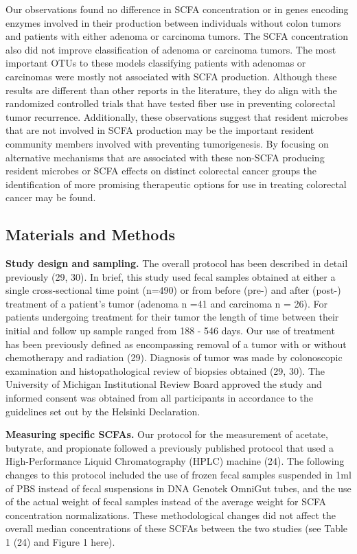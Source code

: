 \documentclass[11pt,]{article}
\begin{document}
Our observations found no difference in SCFA concentration or in genes
encoding enzymes involved in their production between individuals
without colon tumors and patients with either adenoma or carcinoma
tumors. The SCFA concentration also did not improve classification of
adenoma or carcinoma tumors. The most important OTUs to these models
classifying patients with adenomas or carcinomas were mostly not
associated with SCFA production. Although these results are different
than other reports in the literature, they do align with the randomized
controlled trials that have tested fiber use in preventing colorectal
tumor recurrence. Additionally, these observations suggest that resident
microbes that are not involved in SCFA production may be the important
resident community members involved with preventing tumorigenesis. By
focusing on alternative mechanisms that are associated with these
non-SCFA producing resident microbes or SCFA effects on distinct
colorectal cancer groups the identification of more promising
therapeutic options for use in treating colorectal cancer may be found.

\newpage

\subsection{Materials and Methods}\label{materials-and-methods}

\textbf{Study design and sampling.} The overall protocol has been
described in detail previously (29, 30). In brief, this study used fecal
samples obtained at either a single cross-sectional time point (n=490)
or from before (pre-) and after (post-) treatment of a patient's tumor
(adenoma n =41 and carcinoma n = 26). For patients undergoing treatment
for their tumor the length of time between their initial and follow up
sample ranged from 188 - 546 days. Our use of treatment has been
previously defined as encompassing removal of a tumor with or without
chemotherapy and radiation (29). Diagnosis of tumor was made by
colonoscopic examination and histopathological review of biopsies
obtained (29, 30). The University of Michigan Institutional Review Board
approved the study and informed consent was obtained from all
participants in accordance to the guidelines set out by the Helsinki
Declaration.

\textbf{Measuring specific SCFAs.} Our protocol for the measurement of
acetate, butyrate, and propionate followed a previously published
protocol that used a High-Performance Liquid Chromatography (HPLC)
machine (24). The following changes to this protocol included the use of
frozen fecal samples suspended in 1ml of PBS instead of fecal
suspensions in DNA Genotek OmniGut tubes, and the use of the actual
weight of fecal samples instead of the average weight for SCFA
concentration normalizations. These methodological changes did not
affect the overall median concentrations of these SCFAs between the two
studies (see Table 1 (24) and Figure 1 here).
\end{document}

